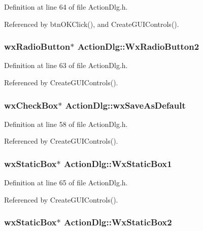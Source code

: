 Definition at line 64 of file Action\-Dlg.h.

Referenced by btn\-OKClick(), and Create\-GUIControls().
\subsubsection{\setlength{\rightskip}{0pt plus 5cm}wx\-Radio\-Button$\ast$ {\bf Action\-Dlg::Wx\-Radio\-Button2}\hspace{0.3cm}{\tt  [private]}}\label{class_action_dlg_e66c581180f23527f41506734ebb1073}




Definition at line 63 of file Action\-Dlg.h.

Referenced by Create\-GUIControls().
\subsubsection{\setlength{\rightskip}{0pt plus 5cm}wx\-Check\-Box$\ast$ {\bf Action\-Dlg::wx\-Save\-As\-Default}\hspace{0.3cm}{\tt  [private]}}\label{class_action_dlg_35ee6fac0fa7fdc657243b7f727a868f}




Definition at line 58 of file Action\-Dlg.h.

Referenced by Create\-GUIControls().
\subsubsection{\setlength{\rightskip}{0pt plus 5cm}wx\-Static\-Box$\ast$ {\bf Action\-Dlg::Wx\-Static\-Box1}\hspace{0.3cm}{\tt  [private]}}\label{class_action_dlg_e756b29ebb8c272abe954a05f2a082bc}




Definition at line 65 of file Action\-Dlg.h.

Referenced by Create\-GUIControls().
\subsubsection{\setlength{\rightskip}{0pt plus 5cm}wx\-Static\-Box$\ast$ {\bf Action\-Dlg::Wx\-Static\-Box2}\hspace{0.3cm}{\tt  [private]}}\label{class_action_dlg_21498af3c36fe37e889c79d33929511d}




